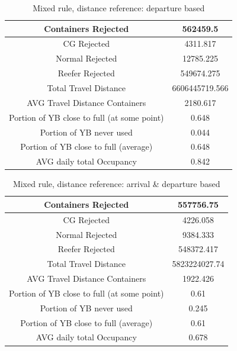\documentclass{article}
\begin{document}
\begin{table}[h]
    \centering
    \begin{tabular}{|c|c|}
        \hline
        Containers Rejected                         & 562459.5       \\ \hline
        CG Rejected                                 & 4311.817       \\ \hline
        Normal Rejected                             & 12785.225      \\ \hline
        Reefer Rejected                             & 549674.275     \\ \hline
        Total Travel Distance                       & 6606445719.566 \\ \hline
        AVG Travel Distance Containers              & 2180.617       \\ \hline
        Portion of YB close to full (at some point) & 0.648          \\ \hline
        Portion of YB never used                    & 0.044          \\ \hline
        Portion of YB close to full (average)       & 0.648          \\ \hline
        AVG daily total Occupancy                   & 0.842          \\ \hline
    \end{tabular}
    \caption{Mixed rule, distance reference: departure based}
\end{table}

\begin{table}[h]
    \centering
    \begin{tabular}{|c|c|}
        \hline
        Containers Rejected                         & 557756.75     \\ \hline
        CG Rejected                                 & 4226.058      \\ \hline
        Normal Rejected                             & 9384.333      \\ \hline
        Reefer Rejected                             & 548372.417    \\ \hline
        Total Travel Distance                       & 5823224027.74 \\ \hline
        AVG Travel Distance Containers              & 1922.426      \\ \hline
        Portion of YB close to full (at some point) & 0.61          \\ \hline
        Portion of YB never used                    & 0.245         \\ \hline
        Portion of YB close to full (average)       & 0.61          \\ \hline
        AVG daily total Occupancy                   & 0.678         \\ \hline
    \end{tabular}
    \caption{Mixed rule, distance reference: arrival \& departure based}
\end{table}
\end{document}
